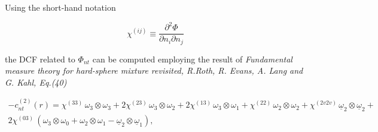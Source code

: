 \documentclass{article}
\begin{document}
Using the short-hand notation 

\begin{equation}
	\chi^{(ij)} \equiv \frac{\partial^2\Phi}{\partial n_i\partial n_j}
\end{equation}

the DCF related to $\Phi_{nt}$ can be computed employing the result of \textit{Fundamental measure theory for hard-sphere mixture revisited, R.Roth, R. Evans, A. Lang and G. Kahl, Eq.(40)}

\begin{gather}\label{DCFnt}
	-c^{(2)}_{nt}(r) = \chi^{(33)}\,\omega_3\otimes\omega_3+2\chi^{(23)}\,\omega_3\otimes\omega_2+2\chi^{(13)}\,\omega_3\otimes\omega_1+\chi^{(22)}\,\omega_2\otimes\omega_2+\chi^{(2v2v)}\,\underline{\omega}_2\otimes\underline{\omega}_2+\\\nonumber
	2\chi^{(03)}\,\left(\omega_3\otimes\omega_0+\omega_2\otimes\omega_1-\underline{\omega}_2\otimes\underline{\omega}_1\right),
\end{gather}
\end{document}
